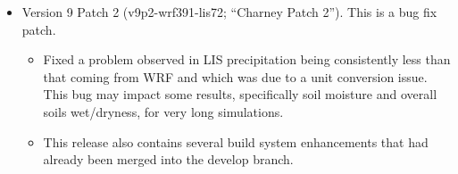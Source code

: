 \begin{itemize}
\item Version 9 Patch 2 (v9p2-wrf391-lis72; ``Charney Patch 2''). This is a bug fix patch.
  \begin{itemize}
    \item Fixed a problem observed in LIS precipitation being consistently less than that coming from WRF 
    and which was due to a unit conversion issue. This bug may impact some results, specifically soil moisture 
    and overall soils wet/dryness, for very long simulations.
    \item This release also contains several build system enhancements that had already been merged 
    into the develop branch.
  \end{itemize}
\end{itemize}


